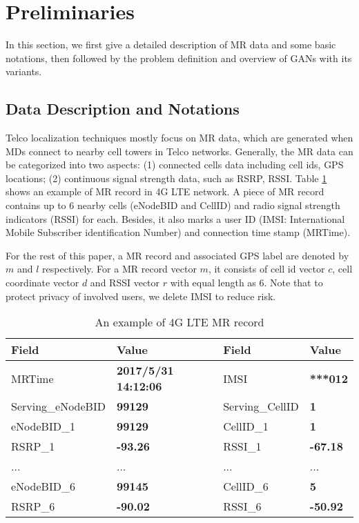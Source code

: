 \section{Preliminaries}
In this section, we first give a detailed description of MR data and some basic notations, then followed by the problem definition and overview of GANs \cite{DBLP:conf/nips/GoodfellowPMXWOCB14} with its variants.

\subsection{Data Description and Notations}
Telco localization techniques mostly focus on MR data, which are generated when MDs connect to nearby cell towers in Telco networks. Generally, the MR data can be categorized into two aspects: (1) connected cells data including cell ids, GPS locations; (2) continuous signal strength data, such as RSRP, RSSI. Table \ref{tab:mr} shows an example of MR record in 4G LTE network. A piece of MR record contains up to 6 nearby cells (eNodeBID and CellID) and radio signal strength indicators (RSSI) for each. Besides, it also marks a user ID (IMSI: International Mobile Subscriber identification Number) and connection time stamp (MRTime).

For the rest of this paper, a MR record and associated GPS label are denoted by $m$ and $l$ respectively. For a MR record vector $m$, it consists of cell id vector $c$, cell coordinate vector $d$ and RSSI vector $r$ with equal length as 6. Note that to protect privacy of involved users, we delete IMSI to reduce risk.

\begin{table}\scriptsize
\caption{An example of 4G LTE MR record}\label{tab:mr}
  \centering
  \begin{tabular}{|l|l||l|l|}
  \hline
  \textbf{Field}    & \textbf{Value}                 & \textbf{Field}    & \textbf{Value}   \\ \hline \hline
  MRTime            & {\textbf{2017/5/31 14:12:06}}  & IMSI              & \textbf{***012}  \\ \hline
  Serving\_eNodeBID & \textbf{99129}                 & Serving\_CellID   & \textbf{1}       \\ \hline
  eNodeBID\_1       & \textbf{99129}                 & CellID\_1         & \textbf{1}       \\ \hline
  RSRP\_1           & \textbf{-93.26}                & RSSI\_1           & \textbf{-67.18}  \\ \hline
  ...               & ...                            & ...               & ...              \\ \hline
  eNodeBID\_6       & \textbf{99145}                 & CellID\_6         & \textbf{5}       \\ \hline
  RSRP\_6           & \textbf{-90.02}                & RSSI\_6           & \textbf{-50.92}  \\ \hline
  \end{tabular}
\end{table}

